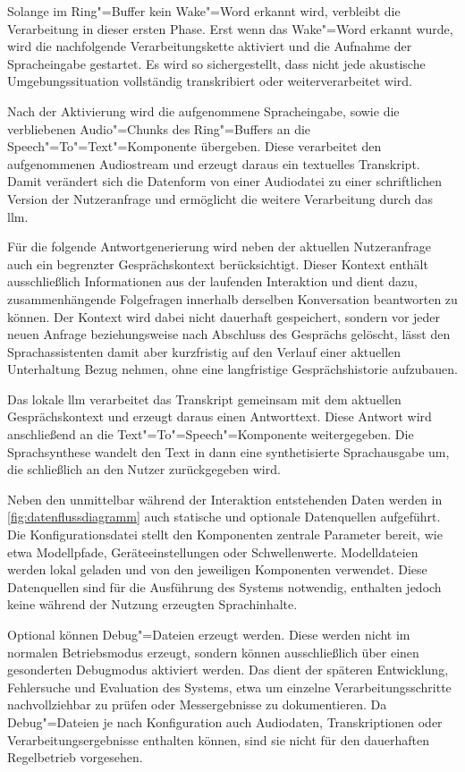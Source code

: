 Solange im Ring"=Buffer kein Wake"=Word erkannt wird, verbleibt die Verarbeitung in dieser ersten Phase. Erst wenn das Wake"=Word erkannt wurde, wird die nachfolgende Verarbeitungskette aktiviert und die Aufnahme der Spracheingabe gestartet. Es wird so sichergestellt, dass nicht jede akustische Umgebungssituation vollständig transkribiert oder weiterverarbeitet wird.

Nach der Aktivierung wird die aufgenommene Spracheingabe, sowie die verbliebenen Audio"=Chunks des Ring"=Buffers an die Speech"=To"=Text"=Komponente übergeben. Diese verarbeitet den aufgenommenen Audiostream und erzeugt daraus ein textuelles Transkript. Damit verändert sich die Datenform von einer Audiodatei zu einer schriftlichen Version der Nutzeranfrage und ermöglicht die weitere Verarbeitung durch das \gls{llm}.

Für die folgende Antwortgenerierung wird neben der aktuellen Nutzeranfrage auch ein begrenzter Gesprächskontext berücksichtigt. Dieser Kontext enthält ausschließlich Informationen aus der laufenden Interaktion und dient dazu, zusammenhängende Folgefragen innerhalb derselben Konversation beantworten zu können. Der Kontext wird dabei nicht dauerhaft gespeichert, sondern vor jeder neuen Anfrage beziehungsweise nach Abschluss des Gesprächs gelöscht, lässt den Sprachassistenten damit aber kurzfristig auf den Verlauf einer aktuellen Unterhaltung Bezug nehmen, ohne eine langfristige Gesprächshistorie aufzubauen.

Das lokale \gls{llm} verarbeitet das Transkript gemeinsam mit dem aktuellen Gesprächskontext und erzeugt daraus einen Antworttext. Diese Antwort wird anschließend an die Text"=To"=Speech"=Komponente weitergegeben. Die Sprachsynthese wandelt den Text in dann eine synthetisierte Sprachausgabe um, die schließlich an den Nutzer zurückgegeben wird.

Neben den unmittelbar während der Interaktion entstehenden Daten werden in \autoref{fig:datenflussdiagramm} auch statische und optionale Datenquellen aufgeführt. Die Konfigurationsdatei stellt den Komponenten zentrale Parameter bereit, wie etwa Modellpfade, Geräteeinstellungen oder Schwellenwerte. Modelldateien werden lokal geladen und von den jeweiligen Komponenten verwendet. Diese Datenquellen sind für die Ausführung des Systems notwendig, enthalten jedoch keine während der Nutzung erzeugten Sprachinhalte.

Optional können Debug"=Dateien erzeugt werden. Diese werden nicht im normalen Betriebsmodus erzeugt, sondern können ausschließlich über einen gesonderten Debugmodus aktiviert werden. Das dient der späteren Entwicklung, Fehlersuche und Evaluation des Systems, etwa um einzelne Verarbeitungsschritte nachvollziehbar zu prüfen oder Messergebnisse zu dokumentieren. Da Debug"=Dateien je nach Konfiguration auch Audiodaten, Transkriptionen oder Verarbeitungsergebnisse enthalten können, sind sie nicht für den dauerhaften Regelbetrieb vorgesehen.

